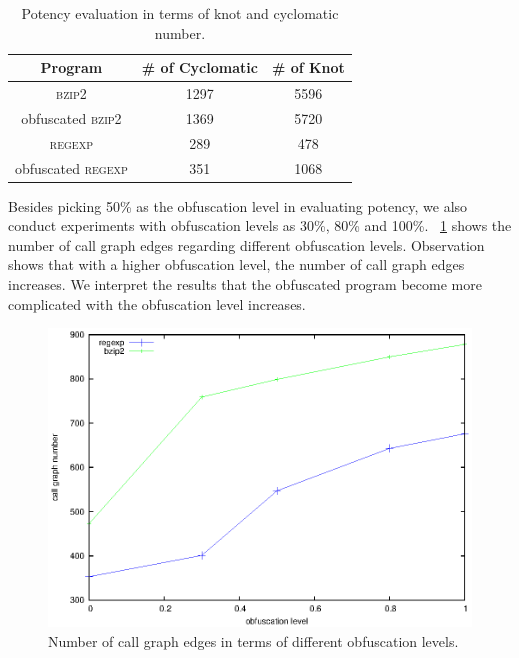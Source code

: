 \begin{table}
  \centering
 \caption{Potency evaluation in terms of knot and cyclomatic number.}
 \label{tab:three}
 \begin{tabular}{|c|c|c|}
 \hline 
 \textbf{Program} & \textbf{\# of Cyclomatic} & \textbf{\# of Knot} \\
 \hline
\textsc{bzip2} & 1297 & 5596  \\ 
 \hline
obfuscated \textsc{bzip2} & 1369 & 5720  \\
 \hline
\textsc{regexp} & 289 & 478 \\ 
 \hline
obfuscated \textsc{regexp} & 351 & 1068 \\
 \hline
\end{tabular}
\end{table}

Besides picking 50\% as the obfuscation level in evaluating potency, we also
conduct experiments with obfuscation levels as 30\%, 80\% and 100\%.
\F~\ref{fig:seven} shows the number of call graph edges regarding different
obfuscation levels. Observation shows that with a higher obfuscation level, the
number of call graph edges increases. We interpret the results that the
obfuscated program become more complicated with the obfuscation level increases.

\begin{figure}
  \includegraphics[width=0.9\linewidth]{cg.eps}
  \caption{Number of call graph edges in terms of different obfuscation levels.}
  \label{fig:seven}
\end{figure}


